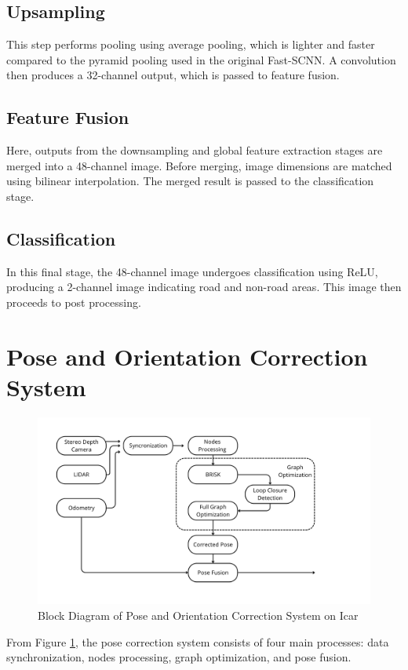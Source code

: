 \subsection{Upsampling}
This step performs pooling using average pooling, which is lighter and faster compared to the pyramid pooling used in the original Fast-SCNN. A convolution then produces a 32-channel output, which is passed to feature fusion.

\subsection{Feature Fusion}
Here, outputs from the downsampling and global feature extraction stages are merged into a 48-channel image. Before merging, image dimensions are matched using bilinear interpolation. The merged result is passed to the classification stage.

\subsection{Classification}
In this final stage, the 48-channel image undergoes classification using ReLU, producing a 2-channel image indicating road and non-road areas. This image then proceeds to post processing.

\section{Pose and Orientation Correction System}
\begin{figure}[H]
	\centering
	\includegraphics[width=\linewidth]{../konten/GNSS(20).png}
	\caption{Block Diagram of Pose and Orientation Correction System on Icar}
	\label{fig:slam_system}
\end{figure} 

From Figure \ref{fig:slam_system}, the pose correction system consists of four main processes: data synchronization, nodes processing, graph optimization, and pose fusion.

